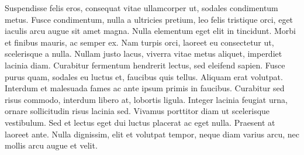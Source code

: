 Suspendisse felis eros, consequat vitae ullamcorper ut, sodales condimentum metus. Fusce condimentum, nulla a ultricies pretium, leo felis tristique orci, eget iaculis arcu augue sit amet magna. Nulla elementum eget elit in tincidunt. Morbi et finibus mauris, ac semper ex. Nam turpis orci, laoreet eu consectetur ut, scelerisque a nulla. Nullam justo lacus, viverra vitae metus aliquet, imperdiet lacinia diam. Curabitur fermentum hendrerit lectus, sed eleifend sapien. Fusce purus quam, sodales eu luctus et, faucibus quis tellus. Aliquam erat volutpat. Interdum et malesuada fames ac ante ipsum primis in faucibus. Curabitur sed risus commodo, interdum libero at, lobortis ligula. Integer lacinia feugiat urna, ornare sollicitudin risus lacinia sed. Vivamus porttitor diam ut scelerisque vestibulum. Sed et lectus eget dui luctus placerat ac eget nulla. Praesent at laoreet ante. Nulla dignissim, elit et volutpat tempor, neque diam varius arcu, nec mollis arcu augue et velit.
